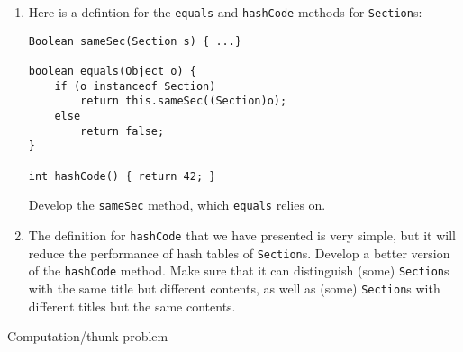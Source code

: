 \documentclass[12pt]{article}                   %
\def\pts#1{\marginpar{\footnotesize \raggedright  \fbox{#1 {\sc Points}}}}
\begin{document}
\begin{problem}
\begin{enumerate}
\ifrubric
\else
{}
\fi
\newpage

\noindent
\item Here is a defintion for the \texttt{equals} and \texttt{hashCode}
methods for \texttt{Section}s:

\begin{verbatim}
Boolean sameSec(Section s) { ...}

boolean equals(Object o) {
    if (o instanceof Section)
        return this.sameSec((Section)o);
    else
        return false;
}

int hashCode() { return 42; }
\end{verbatim}

\noindent
Develop the \texttt{sameSec} method, which \texttt{equals} relies on.

\ifrubric
\else
{}
\fi
\newpage

\noindent
\item The definition for \texttt{hashCode} that we have presented is very
simple, but it will reduce the performance of hash tables of
\texttt{Section}s.  Develop a better version of the \texttt{hashCode}
method.  Make sure that it can distinguish (some) \texttt{Section}s
with the same title but different contents, as well as (some)
\texttt{Section}s with different titles but the same contents.

\ifrubric
\else
{}
\fi
\newpage
\newpage
\end{enumerate}
\end{problem}



\begin{problem} \pts{20}

Computation/thunk problem

\ifrubric
\else
{}
\fi
\newpage
\newpage

\end{problem}

\ifrubric
\else
{}
\fi
\newpage


\end{document}
